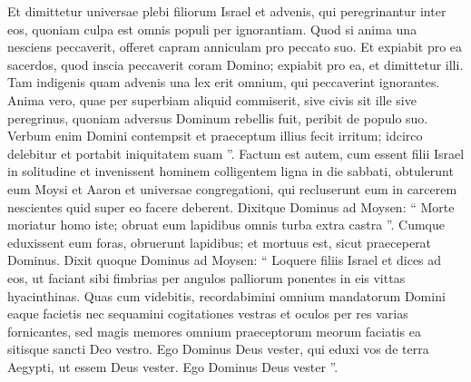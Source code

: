 \begin{biblechapter}
\begin{biblechapter}
\begin{biblechapter}
\begin{biblechapter}
\begin{biblechapter}
\begin{biblechapter}
\begin{biblechapter}
\begin{biblechapter}
\begin{biblechapter}
\begin{biblechapter}
\begin{biblechapter}
\begin{biblechapter}
\begin{biblechapter}
\begin{biblechapter}
\begin{biblechapter}
\verse Et dimittetur universae plebi filiorum Israel et advenis, qui peregrinantur inter eos, quoniam culpa est omnis populi per ignorantiam.
 \verse Quod si anima una nesciens peccaverit, offeret capram anniculam pro peccato suo. 
\verse Et expiabit pro ea sacerdos, quod inscia peccaverit coram Domino; expiabit pro ea, et dimittetur illi. 
\verse Tam indigenis quam advenis una lex erit omnium, qui peccaverint ignorantes.
 \verse Anima vero, quae per superbiam aliquid commiserit, sive civis sit ille sive peregrinus, quoniam adversus Dominum rebellis fuit, peribit de populo suo. 
 \verse Verbum enim Domini contempsit et praeceptum illius fecit irritum; idcirco delebitur et portabit iniquitatem suam ”.
 \verse Factum est autem, cum essent filii Israel in solitudine et invenissent hominem colligentem ligna in die sabbati, 
\verse obtulerunt eum Moysi et Aaron et universae congregationi, 
\verse qui recluserunt eum in carcerem nescientes quid super eo facere deberent. 
\verse Dixitque Dominus ad Moysen: “ Morte moriatur homo iste; obruat eum lapidibus omnis turba extra castra ”. 
\verse Cumque eduxissent eum foras, obruerunt lapidibus; et mortuus est, sicut praeceperat Dominus.
 \verse Dixit quoque Dominus ad Moysen: 
\verse “ Loquere filiis Israel et dices ad eos, ut faciant sibi fimbrias per angulos palliorum ponentes in eis vittas hyacinthinas. 
\verse Quas cum videbitis, recordabimini omnium mandatorum Domini eaque facietis nec sequamini cogitationes vestras et oculos per res varias fornicantes, 
\verse sed magis memores omnium praeceptorum meorum faciatis ea sitisque sancti Deo vestro. 
\verse Ego Dominus Deus vester, qui eduxi vos de terra Aegypti, ut essem Deus vester. Ego Dominus Deus vester ”.
 

\end{biblechapter}
\end{biblechapter}
\end{biblechapter}
\end{biblechapter}
\end{biblechapter}
\end{biblechapter}
\end{biblechapter}
\end{biblechapter}
\end{biblechapter}
\end{biblechapter}
\end{biblechapter}
\end{biblechapter}
\end{biblechapter}
\end{biblechapter}
\end{biblechapter}
